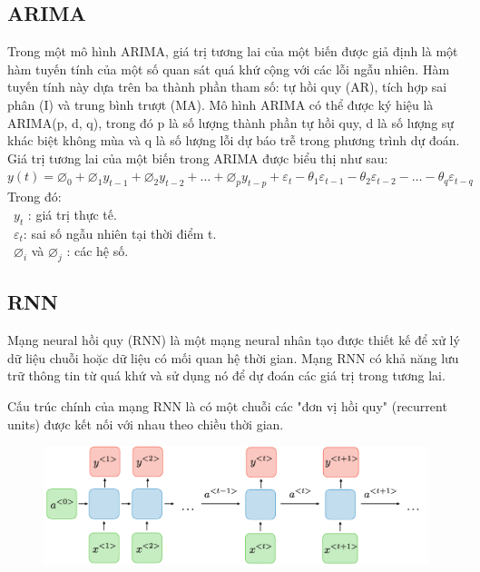 \documentclass[conference]{IEEEtran}
\begin{document}
\subsection{ARIMA}
Trong một mô hình ARIMA, giá trị tương lai của một biến được giả định là một hàm tuyến tính của một số quan sát quá khứ cộng với các lỗi ngẫu nhiên. Hàm tuyến tính này dựa trên ba thành phần tham số: tự hồi quy (AR), tích hợp sai phân (I) và trung bình trượt (MA). Mô hình ARIMA có thể được ký hiệu là ARIMA(p, d, q), trong đó p là số lượng thành phần tự hồi quy, d là số lượng sự khác biệt không mùa và q là số lượng lỗi dự báo trễ trong phương trình dự đoán. Giá trị tương lai của một biến trong ARIMA được biểu thị như sau:\\

\( y(t) = \varnothing_0 + \varnothing_1 y_{t-1} + \varnothing_2 y_{t-2} + \ldots + \varnothing_p y_{t-p} + \varepsilon_t - \theta_1 \varepsilon_{t-1} - \theta_2 \varepsilon_{t-2} - \ldots - \theta_q \varepsilon_{t-q} \) \\

Trong đó:\\
	\indent\textbullet\ \(y_t\) : giá trị thực tế.\\
	\indent\textbullet\ $\varepsilon_t$: sai số ngẫu nhiên tại thời điểm t.\\
        \indent\textbullet\ $\varnothing_i$ và $\varnothing_j$ : các hệ số.\\
\subsection{RNN}
Mạng neural hồi quy (RNN) là một mạng neural nhân tạo được thiết kế để xử lý dữ liệu chuỗi hoặc dữ liệu có mối quan hệ thời gian. Mạng RNN có khả năng lưu trữ thông tin từ quá khứ và sử dụng nó để dự đoán các giá trị trong tương lai.

Cấu trúc chính của mạng RNN là có một chuỗi các "đơn vị hồi quy" (recurrent units) được kết nối với nhau theo chiều thời gian.\\
\begin{figure}[H]
    \centering
    \begin{minipage}{0.5\textwidth}
    \centering
    \includegraphics[width=1\textwidth]{Image/RNN1.png}
    \label{fig:1}
    \end{minipage}
\end{figure}
\end{document}
